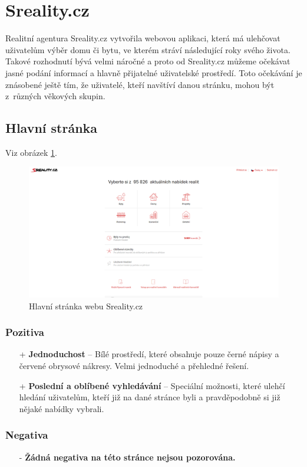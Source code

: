 \section{Sreality.cz}
\label{analyza:sreality}
Realitní agentura Sreality.cz \cite{sreality} vytvořila webovou aplikaci, která má ulehčovat uživatelům výběr domu či bytu, ve kterém stráví následující roky svého života. Takové rozhodnutí bývá velmi náročné a proto od Sreality.cz můžeme očekávat jasné podání informací a hlavně přijatelné uživatelské prostředí. Toto očekávání je znásobené ještě tím, že uživatelé, kteří navštíví danou stránku, mohou být z~různých věkových skupin.

\subsection{Hlavní stránka}
Viz obrázek \ref{fig:sreality:homepage}.
\begin{figure}[h]
    \centering
    \includegraphics[width=1.0\textwidth]{media/sreality/homepage.png}
    \caption{Hlavní stránka webu Sreality.cz}
    \label{fig:sreality:homepage}
\end{figure}
\subsubsection*{Pozitiva}
\begin{itemize}
    \item[+] \textbf{Jednoduchost} -- Bílé prostředí, které obsahuje pouze černé nápisy a červené obrysové nákresy. Velmi jednoduché a přehledné řešení.
    \item[+] \textbf{Poslední a oblíbené vyhledávání} -- Speciální možnosti, které ulehčí hledání uživatelům, kteří již na dané stránce byli a pravděpodobně si již nějaké nabídky vybrali.
\end{itemize}
\subsubsection*{Negativa}
\begin{itemize}
    \item[-] \textbf{Žádná negativa na této stránce nejsou pozorována.}
\end{itemize}


